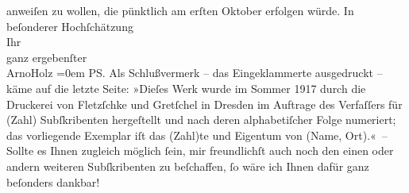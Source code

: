 \begin{ledgroupsized}[t]{13cm}
               anweiſen zu wollen, die pünktlich am erſten Oktober erfolgen würde.\pend
           \pstart
           In beſonderer Hochſchätzung{\\[\baselineskip]}Ihr{\\[\baselineskip]}ganz ergebenſter{\\[\baselineskip]}\spacefill\mbox{ArnoHolz}\pend
           \leftskip=0em{}\pstart
           PS. Als Schlußvermerk – das Eingeklammerte ausgedruckt – käme auf die letzte
               Seite:\pend
           \pstart
           »Dieſes Werk wurde im Sommer 1917 durch die Druckerei von Fletzſchke und Gretſchel in Dresden im Auftrage des Verfaſſers für (Zahl) Subſkribenten
               hergeſtellt und nach deren alphabetiſcher Folge numeriert; das vorliegende Exemplar
               iſt das (Zahl)te und Eigentum von (Name, Ort).« –\pend
           \pstart
           Sollte es Ihnen zugleich möglich ſein, mir freundlichſt auch noch den einen oder
               andern weiteren Subſkribenten zu beſchaffen, ſo wäre ich Ihnen dafür ganz beſonders
               dankbar!\pend
           
         
         \endnumbering{}\end{ledgroupsized}  \newcommand{\dateiname}{L02255}\newcommand{\titel}{Arno Holz an Arthur Schnitzler, 11. 2. 1917}\newcommand{\editorInnen}{Martin Anton Müller und Gerd-Hermann Susen}
      